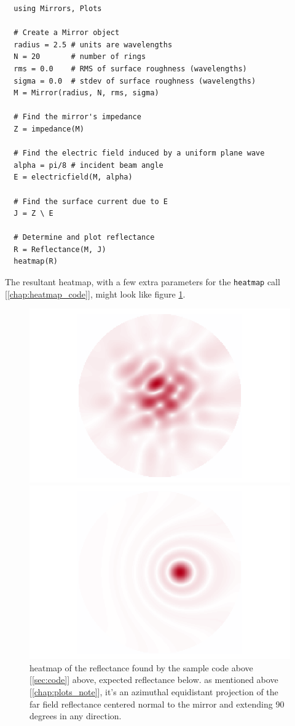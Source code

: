 \documentclass[etd,twoside,senior,noacknowledgments]{BYUPhys}
\begin{document}
\begin{verbatim}
  using Mirrors, Plots

  # Create a Mirror object
  radius = 2.5 # units are wavelengths
  N = 20       # number of rings
  rms = 0.0    # RMS of surface roughness (wavelengths)
  sigma = 0.0  # stdev of surface roughness (wavelengths)
  M = Mirror(radius, N, rms, sigma)

  # Find the mirror's impedance
  Z = impedance(M)

  # Find the electric field induced by a uniform plane wave
  alpha = pi/8 # incident beam angle
  E = electricfield(M, alpha)

  # Find the surface current due to E
  J = Z \ E

  # Determine and plot reflectance
  R = Reflectance(M, J)
  heatmap(R)
\end{verbatim}

The resultant heatmap, with a few extra parameters for the \texttt{heatmap} call [\ref{chap:heatmap_code}], might look like figure \ref{fig:sample_heatmap}.

\begin{figure}
  \centerline{\includegraphics[width=.7\textwidth]{sample-reflectance}}
  \centerline{\includegraphics[width=.7\textwidth]{sample-reflectance-expected}}
  \caption[heatmap from the above sample code]{\label{fig:sample_heatmap}
    heatmap of the reflectance found by the sample code above [\ref{sec:code}] above, expected reflectance below. as mentioned above [\ref{chap:plots_note}], it's an azimuthal equidistant projection of the far field reflectance centered normal to the mirror and extending 90 degrees in any direction.}
\end{figure}
\end{document}
